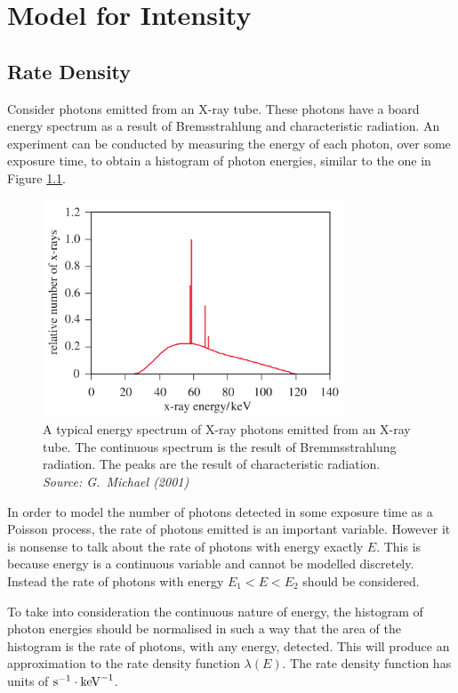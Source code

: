 \documentclass[12pt]{report}
\begin{document}
\chapter{Model for Intensity}
\section{Rate Density}
Consider photons emitted from an X-ray tube. These photons have a board energy spectrum as a result of Bremsstrahlung and characteristic radiation. An experiment can be conducted by measuring the energy of each photon, over some exposure time, to obtain a histogram of photon energies, similar to the one in Figure \ref{fig:x_ray_spectrum2}.

\begin{figure}
\centering
\includegraphics[width=0.8\textwidth]{figures/x_ray_spectrum.png}
\caption{A typical energy spectrum of X-ray photons emitted from an X-ray tube. The continuous spectrum is the result of Bremmsstrahlung radiation. The peaks are the result of characteristic radiation. \emph{Source: G.~Michael (2001) \cite{michael2001x}}}
\label{fig:x_ray_spectrum2}
\end{figure}

In order to model the number of photons detected in some exposure time as a Poisson process, the rate of photons emitted is an important variable. However it is nonsense to talk about the rate of photons with energy exactly $E$. This is because energy is a continuous variable and cannot be modelled discretely. Instead the rate of photons with energy $E_1<E<E_2$ should be considered.

To take into consideration the continuous nature of energy, the histogram of photon energies should be normalised in such a way that the area of the histogram is the rate of photons, with any energy, detected. This will produce an approximation to the rate density function $\lambda(E)$. The rate density function has units of $\textup{s}^{-1}\cdot\textup{keV}^{-1}$.
\end{document}
